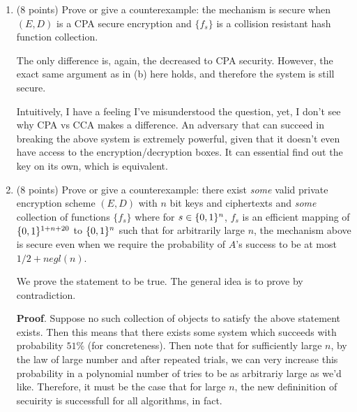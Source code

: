 \documentclass{article}
\begin{document}
\begin{enumerate}[,label=\alph*.]
\item{}
(8 points) Prove or give a counterexample: the mechanism is secure when $(E,D)$ is a CPA secure encryption and $\{ f_s \}$ is a collision resistant hash function collection.%

The only difference is, again, the decreased to CPA security. However, the exact same argument as 
in (b) here
holds, and therefore the system is still secure.%

Intuitively, I have a feeling I've misunderstood the question, yet, I don't see why CPA vs CCA makes
a difference. An adversary that can succeed in breaking the above system is extremely powerful, given
that it doesn't even have access to the encryption/decryption boxes. It can essential find out
the key on its own, which is equivalent.%

\item{}
(8 points)  Prove or give a counterexample: there exist \emph{some} valid private encryption scheme $(E,D)$ with $n$ bit keys and ciphertexts and \emph{some}  collection of functions $\{ f_s \}$ where for $s\in\{0,1\}^n$, $f_s$ is an efficient mapping of  $\{0,1\}^{1+n+20}$ to $\{0,1\}^{n}$ such that for arbitrarily large $n$, the mechanism above is secure even when we require the probability of $A$'s success to be at most $1/2 + negl(n)$.%

We prove the statement to be true. The general idea is to prove by contradiction.%

\begin{mdbmarginx}{1ex}{0pt}{1ex}{0pt}%
\noindent{}\textbf{Proof}.   Suppose no such collection of objects to satisfy the above statement exists. Then this means
 that there exists some system which succeeds with probability $51\%$ (for concreteness). Then
 note that for sufficiently large $n$, by the law of large number and after repeated trials, 
 we can very increase this probability in a polynomial number of tries to be as arbitrariy large as 
 we'd like. Therefore, it must be the case that for large $n$, the new defininition of secuirity is
 successfull for all algorithms, in fact.%
\end{mdbmarginx}%
\end{enumerate}%
\end{document}
